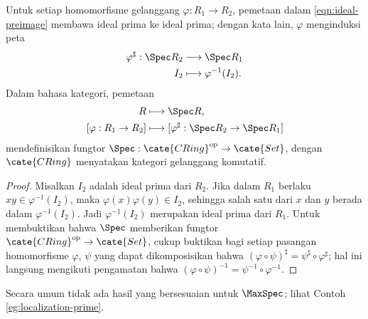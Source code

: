 \begin{lemma}\label{prop:Spec-pullback}
	Untuk setiap homomorfisme gelanggang $\varphi: R_1 \to R_2$, pemetaan dalam \eqref{eqn:ideal-preimage} membawa ideal prima ke ideal prima; dengan kata lain, $\varphi$ menginduksi peta
	\begin{align*}
		\varphi^\sharp: \Spec R_2 & \longrightarrow \Spec R_1 \\
		I_2 & \longmapsto \varphi^{-1}(I_2).
	\end{align*}
	Dalam bahasa kategori, pemetaan
	\begin{align*}
		R & \longmapsto \Spec R, \\
		[\varphi: R_1 \to R_2] & \longmapsto [\varphi^\sharp: \Spec R_2 \to \Spec R_1]
	\end{align*}
	mendefinisikan fungtor $\Spec: \cate{CRing}^\text{op} \to \cate{Set}$, dengan $\cate{CRing}$ menyatakan kategori gelanggang komutatif.
\end{lemma}
\begin{proof}
	Misalkan $I_2$ adalah ideal prima dari $R_2$. Jika dalam $R_1$ berlaku $xy \in \varphi^{-1}(I_2)$, maka $\varphi(x)\varphi(y) \in I_2$, sehingga salah satu dari $x$ dan $y$ berada dalam $\varphi^{-1}(I_2)$. Jadi $\varphi^{-1}(I_2)$ merupakan ideal prima dari $R_1$. Untuk membuktikan bahwa $\Spec$ memberikan fungtor $\cate{CRing}^\text{op} \to \cate{Set}$, cukup buktikan bagi setiap pasangan homomorfisme $\varphi$, $\psi$ yang dapat dikomposisikan bahwa $(\varphi \circ \psi)^\sharp = \psi^\sharp \circ \varphi^\sharp$; hal ini langsung mengikuti pengamatan bahwa $(\varphi \circ \psi)^{-1} = \psi^{-1} \circ \varphi^{-1}$.
\end{proof}

\begin{remark}
	Secara umum tidak ada hasil yang bersesuaian untuk $\MaxSpec$; lihat Contoh \ref{eg:localization-prime}.
\end{remark}

